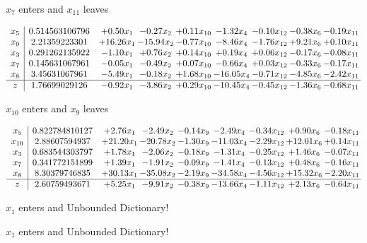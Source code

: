 \documentclass[9pt]{article}
\begin{document}
 $ x_{7} $ enters and $ x_{11} $ leaves 

 \[\begin{array}{c| c c@{\hskip 2pt} c@{\hskip 2pt} c@{\hskip 2pt} c@{\hskip 2pt} c@{\hskip 2pt} c@{\hskip 2pt} c@{\hskip 2pt} }
 x_{5}   &  0.514563106796 & +  0.50 x_{1} & -0.27 x_{2} & +  0.11 x_{10} & -1.32 x_{4} & -0.10 x_{12} & -0.38 x_{6} & -0.19 x_{11}\\
 x_{9}   &  2.21359223301 & + 16.26 x_{1} & -15.94 x_{2} & -0.77 x_{10} & -8.46 x_{4} & -1.76 x_{12} & +  9.21 x_{6} & +  0.10 x_{11}\\
 x_{3}   &  0.291262135922 & -1.10 x_{1} & +  0.76 x_{2} & +  0.14 x_{10} & +  0.19 x_{4} & +  0.06 x_{12} & -0.17 x_{6} & -0.08 x_{11}\\
 x_{7}   &  0.145631067961 & -0.05 x_{1} & -0.49 x_{2} & +  0.07 x_{10} & -0.66 x_{4} & +  0.03 x_{12} & -0.33 x_{6} & -0.17 x_{11}\\
 x_{8}   &  3.45631067961 & -5.49 x_{1} & -0.18 x_{2} & +  1.68 x_{10} & -16.05 x_{4} & -0.71 x_{12} & -4.85 x_{6} & -2.42 x_{11}\\
\hline
z    &  1.76699029126 & -0.92 x_{1} & -3.86 x_{2} & +  0.29 x_{10} & -10.45 x_{4} & -0.45 x_{12} & -1.36 x_{6} & -0.68 x_{11}\\
\end{array}\]


 $ x_{10} $ enters and $ x_{9} $ leaves 

 \[\begin{array}{c| c c@{\hskip 2pt} c@{\hskip 2pt} c@{\hskip 2pt} c@{\hskip 2pt} c@{\hskip 2pt} c@{\hskip 2pt} c@{\hskip 2pt} }
 x_{5}   &  0.822784810127 & +  2.76 x_{1} & -2.49 x_{2} & -0.14 x_{9} & -2.49 x_{4} & -0.34 x_{12} & +  0.90 x_{6} & -0.18 x_{11}\\
 x_{10}   &  2.88607594937 & + 21.20 x_{1} & -20.78 x_{2} & -1.30 x_{9} & -11.03 x_{4} & -2.29 x_{12} & + 12.01 x_{6} & +  0.14 x_{11}\\
 x_{3}   &  0.683544303797 & +  1.78 x_{1} & -2.06 x_{2} & -0.18 x_{9} & -1.31 x_{4} & -0.25 x_{12} & +  1.46 x_{6} & -0.07 x_{11}\\
 x_{7}   &  0.341772151899 & +  1.39 x_{1} & -1.91 x_{2} & -0.09 x_{9} & -1.41 x_{4} & -0.13 x_{12} & +  0.48 x_{6} & -0.16 x_{11}\\
 x_{8}   &  8.30379746835 & + 30.13 x_{1} & -35.08 x_{2} & -2.19 x_{9} & -34.58 x_{4} & -4.56 x_{12} & + 15.32 x_{6} & -2.20 x_{11}\\
\hline
z    &  2.60759493671 & +  5.25 x_{1} & -9.91 x_{2} & -0.38 x_{9} & -13.66 x_{4} & -1.11 x_{12} & +  2.13 x_{6} & -0.64 x_{11}\\
\end{array}\]


 $ x_{1} $ enters and Unbounded Dictionary!


 $ x_{1} $ enters and Unbounded Dictionary!
\end{document}

